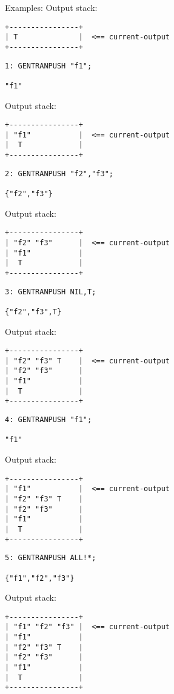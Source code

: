 \begin{describe}{Examples:}
Output stack:
\begin{verbatim}
+----------------+
| T              |  <== current-output
+----------------+
\end{verbatim}
\begin{verbatim}
1: GENTRANPUSH "f1"; 

"f1"
\end{verbatim}
Output stack:
\begin{verbatim}
+----------------+
| "f1"           |  <== current-output
|  T             |
+----------------+
\end{verbatim}
\begin{verbatim}
2: GENTRANPUSH "f2","f3"; 

{"f2","f3"}
\end{verbatim}
Output stack:
\begin{verbatim}
+----------------+
| "f2" "f3"      |  <== current-output
| "f1"           |
|  T             |
+----------------+
\end{verbatim}
\begin{verbatim}
3: GENTRANPUSH NIL,T; 

{"f2","f3",T}
\end{verbatim}
Output stack:
\begin{verbatim}
+----------------+
| "f2" "f3" T    |  <== current-output
| "f2" "f3"      |
| "f1"           |
|  T             |
+----------------+
\end{verbatim}
\begin{verbatim}
4: GENTRANPUSH "f1"; 

"f1"
\end{verbatim}
Output stack:
\begin{verbatim}
+----------------+
| "f1"           |  <== current-output
| "f2" "f3" T    |
| "f2" "f3"      |
| "f1"           |
|  T             |
+----------------+
\end{verbatim}
\begin{verbatim}
5: GENTRANPUSH ALL!*; 

{"f1","f2","f3"}
\end{verbatim}
Output stack:
\begin{verbatim}
+----------------+
| "f1" "f2" "f3" |  <== current-output
| "f1"           |
| "f2" "f3" T    |
| "f2" "f3"      |
| "f1"           |
|  T             |
+----------------+
\end{verbatim}
\end{describe}

